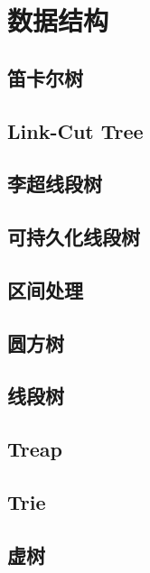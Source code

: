 \section{数据结构}

\subsection{笛卡尔树}


\subsection{Link-Cut Tree}


\subsection{李超线段树}


\subsection{可持久化线段树}


\subsection{区间处理}


\subsection{圆方树}


\subsection{线段树}


\subsection{Treap}


\subsection{Trie}


\subsection{虚树}
